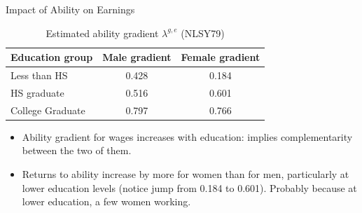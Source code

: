 \documentclass{beamer}
\begin{document}
\begin{frame}[label=Return3]{Impact of Ability on Earnings}

\hyperlink{Income1}{}

\begin {table}[H]
\caption {Estimated ability gradient $\lambda^{g,e}$ (NLSY79)} \label{tab:title} 
\begin{center}
  \begin{tabular}{ l | c | c }
      \hline
    Education group & Male gradient & Female gradient  \\ \hline
     Less than HS & 0.428 & 0.184  \\ 
     HS graduate & 0.516 &   0.601 \\ 
     College Graduate & 0.797& 0.766   \\ 
              \hline
  \end{tabular}
\end{center}
\end {table}

\begin{itemize}
\item Ability gradient for wages increases with education: implies complementarity between the two of them.
\item Returns to ability increase by more for women than for men, particularly at lower education levels (notice jump from 0.184 to 0.601). Probably because at lower education, a few women working.
\end{itemize}

\end{frame}
\end{document}
